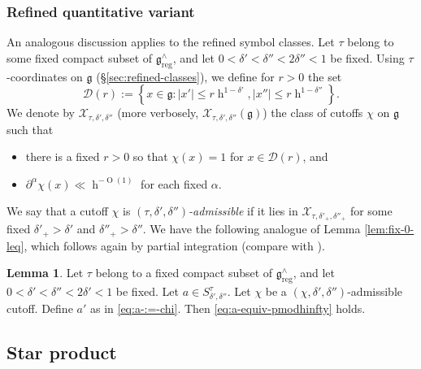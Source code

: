 \documentclass[reqno]{amsart}
\DeclareMathOperator{\h}{h}
\def\O{\operatorname{O}}
\DeclareMathOperator{\reg}{reg}
\theoremstyle{plain} \newtheorem{theorem} {Theorem}
\theoremstyle{definition} \newtheorem{definition} [theorem] {Definition}
\theoremstyle{itplain} %
\newtheorem{lemma}[theorem]{Lemma}
\numberwithin{equation}{section}
\numberwithin{theorem}{section}
\renewcommand{\leq}{\leqslant}
\begin{document}
\subsubsection{Refined quantitative variant}
An analogous discussion applies to the refined symbol classes.  Let $\tau$ belong to some fixed compact subset of $\mathfrak{g}^\wedge_{\reg}$, and let $0 < \delta ' < \delta '' < 2 \delta '' < 1$ be fixed.  Using $\tau$-coordinates on $\mathfrak{g}$ (\S\ref{sec:refined-classes}), we define for $r > 0$ the set
\begin{equation*}
  \mathcal{D} (r) := \left\{ x \in \mathfrak{g} : |x'| \leq r \h^{1 - \delta '}, |x''| \leq r \h ^{1 - \delta ''} \right\}.
\end{equation*}
We denote by $\mathcal{X}_{\tau,\delta ', \delta ''}$ (more verbosely, $\mathcal{X}_{\tau, \delta ', \delta ''}(\mathfrak{g})$) the class of cutoffs $\chi$ on $\mathfrak{g}$ such that
\begin{itemize}
\item there is a fixed $r > 0$ so that $\chi(x) = 1$ for $x \in \mathcal{D}(r)$, and
\item $\partial^{\alpha} \chi(x) \ll \h^{-\O(1)}$ for each fixed $\alpha$.
\end{itemize}
We say that a cutoff $\chi$ is \emph{$(\tau, \delta ', \delta '')$-admissible} if it lies in $\mathcal{X}_{\tau, \delta '_+, \delta ''_+}$ for some fixed $\delta'_+ > \delta '$ and $\delta ''_+ > \delta ''$.  We have the following analogue of Lemma \ref{lem:fix-0-leq}, which follows again by partial integration (compare with \cite[(14.6)]{2020arXiv201202187N}).
\begin{lemma}\label{lem:let-tau-belong}
  Let $\tau$ belong to a fixed compact subset of $\mathfrak{g}^\wedge_{\reg}$, and let $0 < \delta ' < \delta '' < 2 \delta ' < 1$ be fixed.  Let $a \in S^\tau_{\delta ', \delta ''}$.  Let $\chi$ be a $(\chi,\delta ', \delta '')$-admissible cutoff.  Define $a'$ as in \eqref{eq:a-:=-chi}.  Then \eqref{eq:a-equiv-pmodhinfty} holds.
\end{lemma}


\subsection{Star product}\label{sec:star-product}
\end{document}
